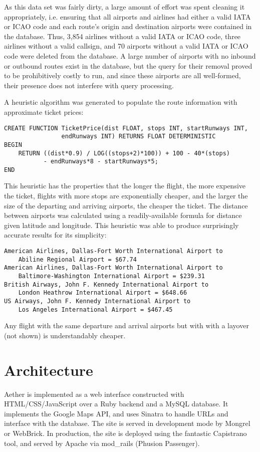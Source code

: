 \indent As this data set was fairly dirty, a large amount of effort was spent cleaning it appropriately, i.e. ensuring that all airports and airlines had either a valid IATA or ICAO code and each route's origin and destination airports were contained in the database. Thus, 3,854 airlines without a valid IATA or ICAO code, three airlines without a valid callsign, and 70 airports without a valid IATA or ICAO code were deleted from the database. A large number of airports with no inbound or outbound routes exist in the database, but the query for their removal proved to be prohibitively costly to run, and since these airports are all well-formed, their presence does not interfere with query processing.
	
\indent A heuristic algorithm was generated to populate the route information with approximate ticket prices: 
\begin{verbatim}
CREATE FUNCTION TicketPrice(dist FLOAT, stops INT, startRunways INT,
                endRunways INT) RETURNS FLOAT DETERMINISTIC
BEGIN
    RETURN ((dist*0.9) / LOG((stops+2)*100)) + 100 - 40*(stops)
           - endRunways*8 - startRunways*5;
END
\end{verbatim}
This heuristic has the properties that the longer the flight, the more expensive the ticket, flights with more stops are exponentially cheaper, and the larger the size of the departing and arriving airports, the cheaper the ticket. The distance between airports was calculated using a readily-available formula for distance given latitude and longitude. This heuristic was able to produce surprisingly accurate results for its simplicity:
\begin{verbatim}
American Airlines, Dallas-Fort Worth International Airport to
    Abiline Regional Airport = $67.74 
American Airlines, Dallas-Fort Worth International Airport to
    Baltimore-Washington International Airport = $239.31
British Airways, John F. Kennedy International Airport to
    London Heathrow International Airport = $648.66
US Airways, John F. Kennedy International Airport to 
    Los Angeles International Airport = $467.45
\end{verbatim}
Any flight with the same departure and arrival airports but with with a layover (not shown) is understandably cheaper.

\section{Architecture}
Aether is implemented as a web interface constructed with HTML/CSS/JavaScript over a Ruby backend and a MySQL database. It implements the Google Maps API, and uses Sinatra to handle URLs and interface with the database. The site is served in development mode by Mongrel or WebBrick. In production, the site is deployed using the fantastic Capistrano tool, and served by Apache via mod\_rails (Phusion Passenger).

